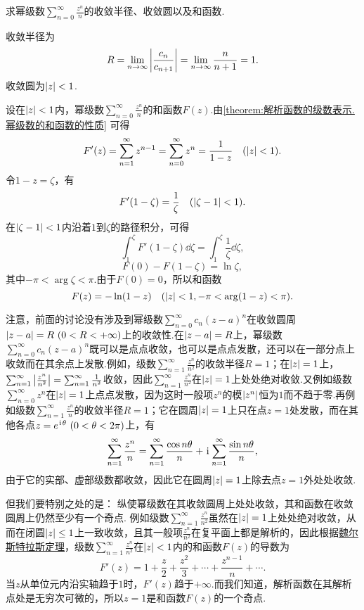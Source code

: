 \begin{example}
求幂级数\(\sum_{n=0}^\infty \frac{z^n}{n}\)的收敛半径、收敛圆以及和函数.
\begin{solution}
收敛半径为\[
R = \lim_{n\to\infty} \abs{\frac{c_n}{c_{n+1}}} = \lim_{n\to\infty} \frac{n}{n+1} = 1.
\]收敛圆为\(\abs{z} < 1\).

设在\(\abs{z} < 1\)内，幂级数\(\sum_{n=0}^\infty \frac{z^n}{n}\)的和函数\(F(z)\).由\cref{theorem:解析函数的级数表示.幂级数的和函数的性质} 可得\[
F'(z) = \sum_{n=1}^\infty z^{n-1}
= \sum_{n=0}^\infty z^n
= \frac{1}{1-z}
\quad(\abs{z} < 1).
\]令\(1-z = \zeta\)，有\[
F'(1-\zeta) = \frac{1}{\zeta}
\quad(\abs{\zeta-1}<1).
\]在\(\abs{\zeta-1}<1\)内沿着\(1\)到\(\zeta\)的路径积分，可得\[
\int_1^{\zeta} F'(1-\zeta) \dd{\zeta}
= \int_1^{\zeta} \frac{1}{\zeta} \dd{\zeta},
\]\[
F(0) - F(1-\zeta)
= \ln \zeta,
\]其中\(-\pi < \arg \zeta < \pi\).由于\(F(0) = 0\)，所以和函数\[
F(z) = -\ln(1-z)
\quad(\abs{z}<1, -\pi < \arg(1-z) < \pi).
\]
\end{solution}
\end{example}
注意，前面的讨论没有涉及到幂级数\(\sum_{n=0}^\infty c_n (z-a)^n\)在收敛圆周\(\abs{z-a}=R\ (0<R<+\infty)\)上的收敛性.在\(\abs{z-a}=R\)上，幂级数\(\sum_{n=0}^\infty c_n (z-a)^n\)既可以是点点收敛，也可以是点点发散，还可以在一部分点上收敛而在其余点上发散.例如，级数\(\sum_{n=1}^\infty \frac{z^n}{n^2}\)的收敛半径\(R=1\)；在\(\abs{z}=1\)上，\(\sum_{n=1}^\infty \abs{\frac{z^n}{n^2}} = \sum_{n=1}^\infty \frac{1}{n^2}\)收敛，因此\(\sum_{n=1}^\infty \frac{z^n}{n^2}\)在\(\abs{z}=1\)上处处绝对收敛.又例如级数\(\sum_{n=0}^\infty z^n\)在\(\abs{z}=1\)上点点发散，因为这时一般项\(z^n\)的模\(\abs{z^n}\)恒为\(1\)而不趋于零.再例如级数\(\sum_{n=1}^\infty \frac{z^n}{n}\)的收敛半径\(R=1\)；它在圆周\(\abs{z}=1\)上只在点\(z=1\)处发散，而在其他各点\(z = e^{\iu\theta}\ (0<\theta<2\pi)\)上，有\[
\sum_{n=1}^\infty \frac{z^n}{n}
= \sum_{n=1}^\infty \frac{\cos n\theta}{n}
+ \kern1pt\mathrm{i}\kern1pt\sum_{n=1}^\infty \frac{\sin n\theta}{n},
\]由于它的实部、虚部级数都收敛，因此它在圆周\(\abs{z}=1\)上除去点\(z=1\)外处处收敛.

但我们要特别之处的是：
纵使幂级数在其收敛圆周上处处收敛，其和函数在收敛圆周上仍然至少有一个奇点.
例如级数\(\sum_{n=1}^\infty \frac{z^n}{n^2}\)虽然在\(\abs{z}=1\)上处处绝对收敛，从而在闭圆\(\abs{z}\leq1\)上一致收敛，且其一般项\(\frac{z^n}{n^2}\)在复平面上都是解析的，因此根据\hyperref[theorem:解析函数的级数表示.魏尔斯特拉斯定理]{魏尔斯特拉斯定理}，级数\(\sum_{n=1}^\infty \frac{z^n}{n^2}\)在\(\abs{z}<1\)内的和函数\(F(z)\)的导数为\[
F'(z) = 1 + \frac{z}{2} + \frac{z^2}{3} + \dotsb + \frac{z^{n-1}}{n} + \dotsb.
\]当\(z\)从单位元内沿实轴趋于\(1\)时，\(F'(z)\)趋于\(+\infty\).而我们知道，解析函数在其解析点处是无穷次可微的，所以\(z=1\)是和函数\(F(z)\)的一个奇点.

